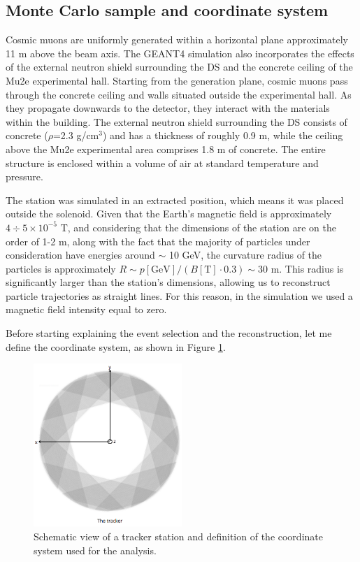 \subsection{Monte Carlo sample and coordinate system }\label{genplane}
Cosmic muons are uniformly generated within a horizontal plane approximately 11 m 
above the beam axis. The GEANT4 simulation also incorporates the effects of the external neutron shield surrounding the DS 
and the concrete ceiling of the Mu2e experimental hall. Starting from the generation plane, 
cosmic muons pass through the concrete ceiling and walls situated outside the experimental hall. 
As they propagate downwards to the detector, they interact with the materials within the building. 
The external neutron shield surrounding the DS consists of concrete ($\rho$=2.3 g/cm$^3$) and has a thickness of 
roughly 0.9 m, while the ceiling above the Mu2e experimental area comprises 1.8 m of concrete. 
The entire structure is enclosed within a volume of air at standard temperature and pressure.

The station was simulated in an extracted position, 
which means it was placed outside the solenoid. 
Given that the Earth's magnetic field is approximately 
$4 \div 5 \times 10^{-5}$ T, 
and considering that the dimensions of the station are 
on the order of 1-2 m, 
along with the fact that the majority of particles 
under consideration have energies around $\sim$ 10 GeV, 
the curvature radius of the particles is approximately 
$R\sim p[\text{GeV}]/(B[\text{T}]\cdot 0.3) \sim 30$ m. 
This radius is significantly larger than the station's 
dimensions, allowing us to reconstruct particle trajectories 
as straight lines.
For this reason, in the simulation we used a 
magnetic field intensity equal to zero. 

Before starting explaining the event selection and the 
reconstruction, let me define the coordinate system, 
as shown in Figure \ref{fig:coordinate}.
\begin{figure}[!h]
    \centering
    \includegraphics[width =0.5\textwidth]{figures/png/Screenshot_20240526_164527.png}
    \caption[Schematic view of a tracker station and the coordinate system.]{Schematic view of a tracker station and definition of the coordinate system used for the analysis.}
    \label{fig:coordinate}
\end{figure}
